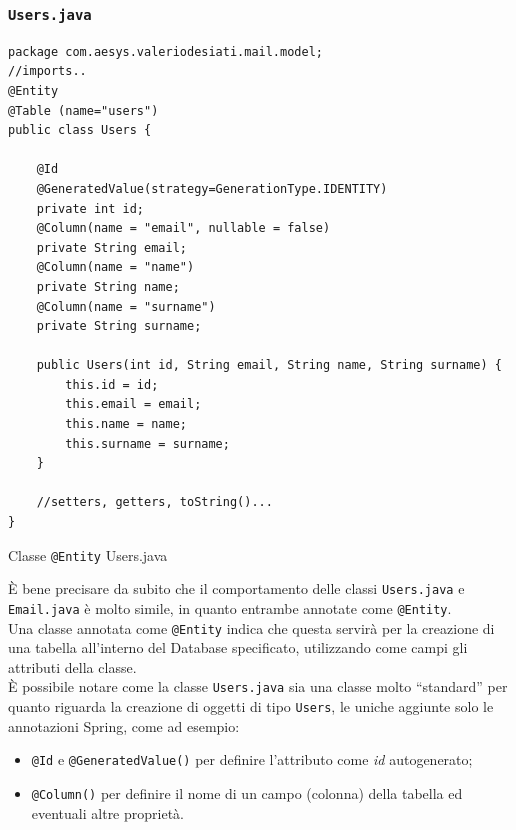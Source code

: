 \subsubsection{\texttt{Users.java}}
\begin{algorithm}[H]
\centering
\begin{verbatim}
package com.aesys.valeriodesiati.mail.model;
//imports..
@Entity
@Table (name="users")
public class Users {

    @Id
    @GeneratedValue(strategy=GenerationType.IDENTITY)
    private int id;
    @Column(name = "email", nullable = false)
    private String email;
    @Column(name = "name")
    private String name;
    @Column(name = "surname")
    private String surname;

    public Users(int id, String email, String name, String surname) {
        this.id = id;
        this.email = email;
        this.name = name;
        this.surname = surname;
    }

    //setters, getters, toString()...
}
\end{verbatim}
\caption{Classe \texttt{@Entity} Users.java}\label{alg:usersjava}
\end{algorithm}

È bene precisare da subito che il comportamento delle classi \texttt{Users.java} e \texttt{Email.java} è molto simile, 
in quanto entrambe annotate come \texttt{@Entity}.\\
Una classe annotata come \texttt{@Entity} indica che questa servirà per la creazione di una tabella all'interno del Database specificato, 
utilizzando come campi gli attributi della classe.\\
È possibile notare come la classe \texttt{Users.java} sia una classe molto “standard” per quanto riguarda la creazione di oggetti di tipo \texttt{Users}, 
le uniche aggiunte solo le annotazioni Spring, come ad esempio:
\begin{itemize}
\item \texttt{@Id} e \texttt{@GeneratedValue()} per definire l'attributo come \emph{id} autogenerato;
\item \texttt{@Column()} per definire il nome di un campo (colonna) della tabella ed eventuali altre proprietà.
\end{itemize}
\newpage
